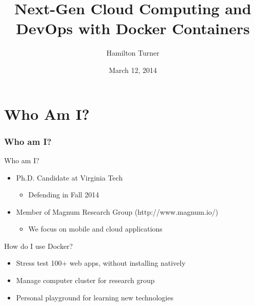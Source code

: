 \documentclass[xcolor=dvipsnames]{beamer}
\title[]{Next-Gen Cloud Computing and DevOps with Docker Containers}
\author[]{Hamilton Turner}
\date[March 2014]{March 12, 2014}
\begin{document}
\begin{frame}
\maketitle
\end{frame}

\section{Who Am I?}
\begin{frame}
  \frametitle{Who am I?}

  Who am I?
  \begin{itemize}
    \item Ph.D. Candidate at Virginia Tech
      \begin{itemize}
      \item Defending in Fall 2014
      \end{itemize}
    \item Member of Magnum Research Group (http://www.magnum.io/)
      \begin{itemize}
      \item We focus on mobile and cloud applications
      \end{itemize}
  \end{itemize}

  How do I use Docker? 
  \begin{itemize}
    \item Stress test 100+ web apps, without installing natively
    \item Manage computer cluster for research group
    \item Personal playground for learning new technologies 
  \end{itemize}
\end{frame}
\end{document}
